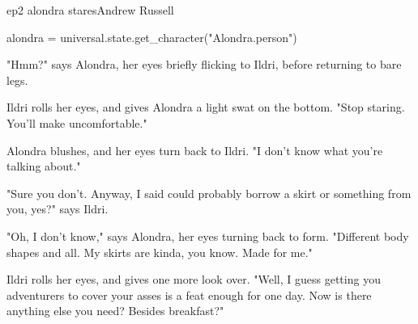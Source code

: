 \documentclass{book}
\begin{document}
\begin{childnode}{ep2 alondra stares}{Andrew Russell}

    \begin{code}

        alondra = universal.state.get\_character("Alondra.person")

    \end{code}

    "Hmm?" says Alondra, her eyes briefly flicking to Ildri, before returning to \names{} bare legs.

    Ildri rolls her eyes, and gives Alondra a light swat on the bottom. "Stop staring. You'll make \himher{} uncomfortable."

    Alondra blushes, and her eyes turn back to Ildri. "I don't know what you're talking about."

    "Sure you don't. Anyway, I said \heshe{} could probably borrow a skirt or something from you, yes?" says Ildri.

    "Oh, I don't know," says Alondra, her eyes turning back to \names{} form. "Different body shapes and all. My skirts are kinda, you know. Made for me."



    Ildri rolls her eyes, and gives \name{} one more look over. "Well, I guess getting you adventurers to cover your asses is a feat enough for one day. Now is there anything else you need? 
    Besides breakfast?"


\end{childnode}
\end{document}
